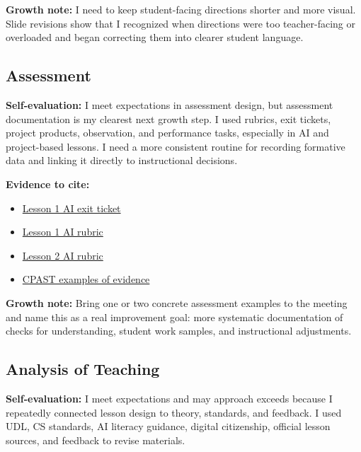 \documentclass[10pt]{article}
\newcommand{\doclink}[2]{\href{run:#1}{#2}}
\begin{document}
\textbf{Growth note:} I need to keep student-facing directions shorter and more visual. Slide revisions show that I recognized when directions were too teacher-facing or overloaded and began correcting them into clearer student language.

\subsection{Assessment}

\textbf{Self-evaluation:} I meet expectations in assessment design, but assessment documentation is my clearest next growth step. I used rubrics, exit tickets, project products, observation, and performance tasks, especially in AI and project-based lessons. I need a more consistent routine for recording formative data and linking it directly to instructional decisions.

\textbf{Evidence to cite:}
\begin{itemize}[leftmargin=*]
  \item \doclink{../../pine-brook-elementary/lessons/grade-3-lamanaco-lallucci-regelsberger-tandoi/magicschool-student-choice-ai-partner-project/lesson1/lesson1-exit_ticket.md}{Lesson 1 AI exit ticket}
  \item \doclink{../../pine-brook-elementary/lessons/grade-3-lamanaco-lallucci-regelsberger-tandoi/magicschool-student-choice-ai-partner-project/lesson1/lesson1-rubric.md}{Lesson 1 AI rubric}
  \item \doclink{../../pine-brook-elementary/lessons/grade-3-lamanaco-lallucci-regelsberger-tandoi/magicschool-student-choice-ai-partner-project/lesson2/lesson2-rubric.md}{Lesson 2 AI rubric}
  \item \doclink{../warner-cpast-examples-of-evidence.docx}{CPAST examples of evidence}
\end{itemize}

\textbf{Growth note:} Bring one or two concrete assessment examples to the meeting and name this as a real improvement goal: more systematic documentation of checks for understanding, student work samples, and instructional adjustments.

\subsection{Analysis of Teaching}

\textbf{Self-evaluation:} I meet expectations and may approach exceeds because I repeatedly connected lesson design to theory, standards, and feedback. I used UDL, CS standards, AI literacy guidance, digital citizenship, official lesson sources, and feedback to revise materials.
\end{document}
